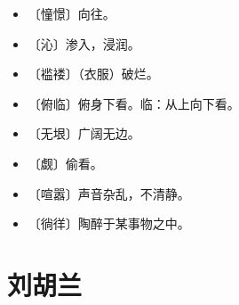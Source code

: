\documentclass[12pt,UTF-8,openany]{ctexbook}
\begin{document}
\vspace{-1em}

\begin{itemize}
    \setlength\itemsep{-0.2em}
    \item 〔憧憬〕向往。
    \item 〔沁〕渗入，浸润。
    \item 〔褴褛〕（衣服）破烂。
    \item 〔俯临〕俯身下看。临：从上向下看。
    \item 〔无垠〕广阔无边。
    \item 〔觑〕偷看。
    \item 〔喧嚣〕声音杂乱，不清静。
    \item 〔徜徉〕陶醉于某事物之中。
\end{itemize}

\chapter{刘胡兰}
\end{document}

